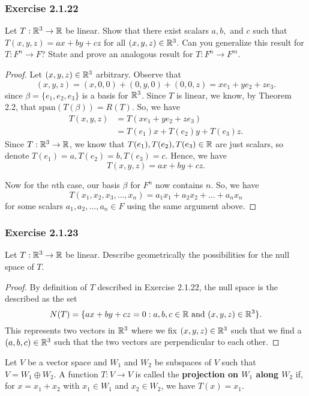 \subsubsection{Exercise 2.1.22} Let \( T: \mathbb{R}^{3} \to \mathbb{R}  \) be linear. Show that there exist scalars \( a,b,  \) and \( c  \) such that  \( T(x,y,z) = ax + by + cz \) for all \( (x,y,z) \in \mathbb{R}^{3} \). Can you generalize this result for \( T: F^{n} \to F  \)? State and prove an analogous result for \( T: F^{n} \to F^{m} \).
\begin{proof}
Let \( (x,y,z) \in \mathbb{R}^{3} \) arbitrary. Observe that 
\[  (x,y,z) = (x,0,0) + (0,y,0) + (0,0,z) = x e_{1} + y e_{2} + z e_{3}.  \]
since \( \beta = \{ e_{1}, e_{2}, e_{3} \}  \) is a basis for \( \mathbb{R}^{3} \). Since \( T  \) is linear, we know, by Theorem 2.2, that \( \text{span}(T(\beta)) = R(T) \). So, we have
\begin{align*}
    T(x,y,z) &= T( xe_{1} + ye_{2} + ze_{3}) \\
             &= T(e_{1})x + T(e_{2})y  + T(e_{3})z .
\end{align*}
Since \( T: \mathbb{R}^{3} \to \mathbb{R}  \), we know that \( T(e_{1}), T(e_{2}), T(e_{3}) \in \mathbb{R}  \) are just scalars, so denote \( T(e_{1}) = a, T(e_{2}) = b, T(e_{3}) = c  \). Hence, we have
\[  T(x,y,z) = ax + by + cz. \]

Now for the \( n \)th case, our basis \( \beta  \) for \( F^{n} \) now contains \( n \). So, we have
\[  T(x_{1}, x_{2}, x_{3}, \dots, x_{n} ) = a_{1} x_{1} + a_{2} x_{2} + \dots + a_{n} x_{n}   \]
for some scalars \( a_{1}, a_{2}, \dots ,a_{n} \in F  \) using the same argument above.
\end{proof}

\subsubsection{Exercise 2.1.23} Let \( T: \mathbb{R}^{3} \to \mathbb{R}  \) be linear. Describe geometrically the possibilities for the null space of \( T  \). 
\begin{proof}
    By definition of \( T  \) described in Exercise 2.1.22, the null space is the described as the set
    \[ N(T) = \{ ax + by + cz = 0: a,b,c \in \R \ \text{and} \ (x,y,z) \in \R^{3} \}.   \]
    This represents two vectors in \( \mathbb{R}^{3} \) where we fix \( (x,y,z) \in \mathbb{R}^{3}  \) such that  we find a \( (a,b,c) \in \mathbb{R}^{3} \) such that the two vectors are perpendicular to each other.
\end{proof}


\begin{definition}[Projections]
   Let \( V  \) be a vector space and \( W_{1} \) and \( W_{2}  \) be subspaces of \( V  \) such that \( V = W_{1} \oplus W_{2} \). A function \( T: V \to V  \) is called the \textbf{projection on \( W_{1} \) along \( W_{2} \)} if, for \( x = x_{1} + x_{2} \) with \( x_{1} \in W_{1} \) and \( x_{2} \in W_{2} \), we have \( T(x) = x_{1} \). 
\end{definition}

